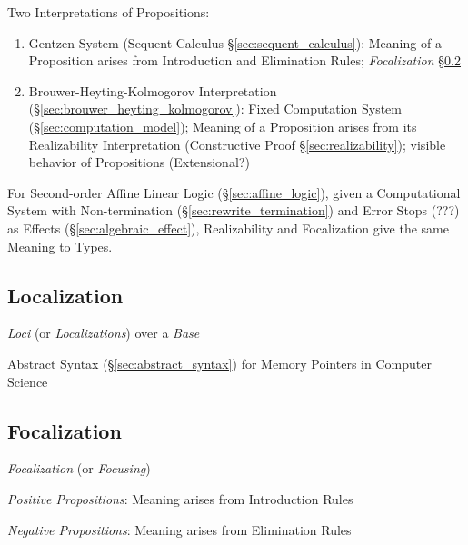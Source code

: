 Two Interpretations of Propositions:

\begin{enumerate}
  \item Gentzen System (Sequent Calculus
    \S\ref{sec:sequent_calculus}): Meaning of a Proposition arises
    from Introduction and Elimination Rules; \emph{Focalization}
    \S\ref{sec:focalization}

  \item Brouwer-Heyting-Kolmogorov Interpretation
    (\S\ref{sec:brouwer_heyting_kolmogorov}): Fixed Computation System
    (\S\ref{sec:computation_model}); Meaning of a Proposition arises
    from its Realizability Interpretation (Constructive Proof
    \S\ref{sec:realizability}); visible behavior of Propositions
    (Extensional?)
\end{enumerate}

For Second-order Affine Linear Logic (\S\ref{sec:affine_logic}), given
a Computational System with Non-termination
(\S\ref{sec:rewrite_termination}) and Error Stops (???) as Effects
(\S\ref{sec:algebraic_effect}), Realizability and Focalization give
the same Meaning to Types.



\subsection{Localization}\label{sec:localization}

\emph{Loci} (or \emph{Localizations}) over a \emph{Base}

Abstract Syntax (\S\ref{sec:abstract_syntax}) for Memory Pointers in
Computer Science



\subsection{Focalization}\label{sec:focalization}

\emph{Focalization} (or \emph{Focusing})

\emph{Positive Propositions}: Meaning arises from Introduction Rules

\emph{Negative Propositions}: Meaning arises from Elimination Rules

